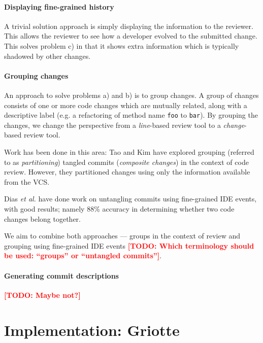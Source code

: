 \documentclass[conference,a4paper]{IEEEtran}
\newcommand{\code}[1]{\texttt{#1}}
\newcommand{\todo}[1]{\textbf{\textcolor{red}{{[}TODO: #1{]}}}}
\begin{document}
\paragraph{Displaying fine-grained history}

A trivial solution approach is simply displaying the information to
the reviewer. This allows the reviewer to see how a developer evolved
to the submitted change. This solves problem c) in that it shows extra
information which is typically shadowed by other changes.

\paragraph{Grouping changes}

An approach to solve problems a) and b) %
is to group changes. A group of changes consists of one or more code
changes which are mutually related, along with a descriptive label
(e.g. a refactoring of method name \code{foo} to \code{bar}). By
grouping the changes, we change the perspective from a
\textit{line}-based review tool to a \textit{change}-based review
tool.

Work has been done in this area: Tao and Kim\cite{Tao15a} have
explored grouping (referred to as \textit{partitioning}) tangled
commits (\textit{composite changes}) in the context of code
review. However, they partitioned changes using only the information
available from the VCS.

Dias \textit{et al.}\cite{Dias15a} have done work on untangling
commits using fine-grained IDE events, with good results; namely 88\%
accuracy in determining whether two code changes belong together.

We aim to combine both approaches --- groups in the context of review
and grouping using fine-grained IDE events \todo{Which terminology
  should be used: ``groups'' or ``untangled commits''}.

\paragraph{Generating commit descriptions}

\todo{Maybe not?}

\section{Implementation: Griotte}
\label{sec:impl-griotte}
\end{document}
